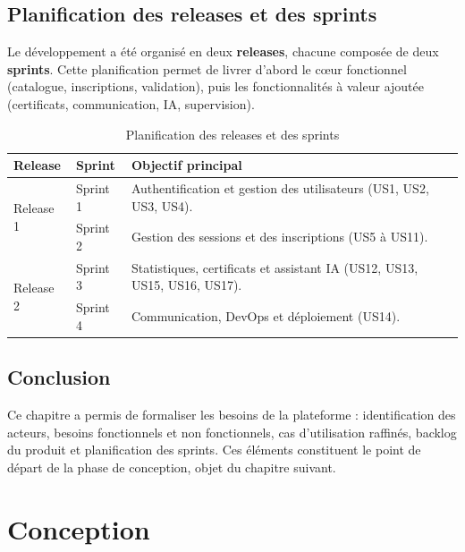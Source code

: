 \documentclass[12pt,a4paper,oneside]{report}
\begin{document}
\section{Planification des releases et des sprints}
Le développement a été organisé en deux \textbf{releases}, chacune composée de deux
\textbf{sprints}. Cette planification permet de livrer d'abord le cœur fonctionnel (catalogue,
inscriptions, validation), puis les fonctionnalités à valeur ajoutée (certificats,
communication, IA, supervision).

\begin{table}[H]\centering\renewcommand{\arraystretch}{1.3}
\begin{tabular}{|p{2.4cm}|p{2.2cm}|p{8.6cm}|}\hline
\rowcolor{gray!15}\textbf{Release} & \textbf{Sprint} & \textbf{Objectif principal} \\ \hline
\multirow{2}{*}{Release 1}
 & Sprint 1 & Authentification et gestion des utilisateurs (US1, US2, US3, US4). \\ \cline{2-3}
 & Sprint 2 & Gestion des sessions et des inscriptions (US5 à US11). \\ \hline
\multirow{2}{*}{Release 2}
 & Sprint 3 & Statistiques, certificats et assistant IA (US12, US13, US15, US16, US17). \\ \cline{2-3}
 & Sprint 4 & Communication, DevOps et déploiement (US14). \\ \hline
\end{tabular}
\caption{Planification des releases et des sprints}\label{tab:planning}
\end{table}

\section*{Conclusion}
Ce chapitre a permis de formaliser les besoins de la plateforme : identification des acteurs,
besoins fonctionnels et non fonctionnels, cas d'utilisation raffinés, backlog du produit et
planification des sprints. Ces éléments constituent le point de départ de la phase de
conception, objet du chapitre suivant.
\clearpage

\chapter{Conception}
\minitoc
\vspace{0.6cm}
\end{document}
